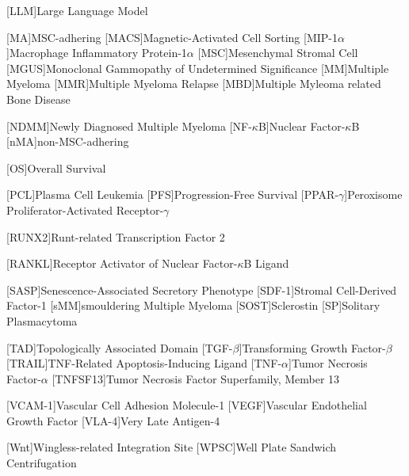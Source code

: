 {\begin{spacing}{-.0}
\begin{acronym}
            [LLM]{Large Language Model}

            [MA]{MSC-adhering}
            [MACS]{Magnetic-Activated Cell Sorting}
            [MIP-1$\alpha$]{Macrophage Inflammatory Protein-1$\alpha$}
            [MSC]{Mesenchymal Stromal Cell}
            [MGUS]{Monoclonal Gammopathy of Undetermined Significance}
            [MM]{Multiple Myeloma}
            [MMR]{Multiple Myeloma Relapse}
            [MBD]{Multiple Myleoma related Bone Disease}

            [NDMM]{Newly Diagnosed Multiple Myeloma}
            [NF-$\kappa$B]{Nuclear Factor-$\kappa$B}
            [nMA]{non-MSC-adhering}

            [OS]{Overall Survival}

            [PCL]{Plasma Cell Leukemia}
            [PFS]{Progression-Free Survival}
            [PPAR-$\gamma$]{Peroxisome Proliferator-Activated Receptor\nolinebreak-$\gamma$}

            [RUNX2]{Runt-related Transcription Factor 2}

            [RANKL]{Receptor Activator of Nuclear Factor-$\kappa$B Ligand}

            [SASP]{Senescence-Associated Secretory Phenotype} %
            [SDF-1]{Stromal Cell-Derived Factor-1}
            [sMM]{smouldering Multiple Myeloma}
            [SOST]{Sclerostin}
            [SP]{Solitary Plasmacytoma}

            [TAD]{Topologically Associated Domain}
            [TGF-$\beta$]{Transforming Growth Factor-$\beta$}
            [TRAIL]{TNF-Related Apoptosis-Inducing Ligand}
            [TNF-$\alpha$]{Tumor Necrosis Factor-$\alpha$}
            [TNFSF13]{Tumor Necrosis Factor Superfamily, Member 13}

            [VCAM-1]{Vascular Cell Adhesion Molecule-1}
            [VEGF]{Vascular Endothelial Growth Factor}
            [VLA-4]{Very Late Antigen-4 }

            [Wnt]{Wingless-related Integration Site}
            [WPSC]{Well Plate Sandwich Centrifugation}


        \end{acronym}
    \end{spacing}
}